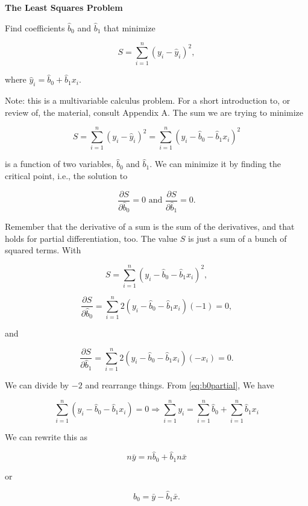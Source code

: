 \documentclass[
]{book}
\theoremstyle{definition}
\theoremstyle{definition}
\theoremstyle{definition}
\theoremstyle{definition}
\theoremstyle{remark}
\begin{document}
\begin{propbox}
\textbf{The Least Squares Problem}

Find coefficients \(\hat{b}_0\) and \(\hat{b}_1\) that minimize

\[S=\sum_{i=1}^n (y_i-\hat{y}_i)^2,\]

where \(\hat{y}_i=\hat{b}_0+\hat{b}_1 x_i.\)

\end{propbox}

Note: this is a multivariable calculus problem. For a short introduction to, or review of, the material, consult Appendix A. The sum we are trying to minimize

\[S=\sum_{i=1}^n (y_i-\hat{y}_i)^2=\sum_{i=1}^n(y_i-\hat{b}_0-\hat{b}_1x_i)^2\]

is a function of two variables, \(\hat{b}_0\) and \(\hat{b}_1\). We can minimize it by finding the critical point, i.e., the solution to

\[\frac{\partial S}{\partial \hat{b}_0}=0\text{ and }\frac{\partial S}{\partial \hat{b}_1}=0.\]

Remember that the derivative of a sum is the sum of the derivatives, and that holds for partial differentiation, too. The value \(S\) is just a sum of a bunch of squared terms. With

\[S=\sum_{i=1}^n(y_i-\hat{b}_0-\hat{b}_1x_i)^2,\]

\begin{equation}
\frac{\partial S}{\partial \hat{b}_0}=\sum_{i=1}^n 2(y_i-\hat{b}_0-\hat{b}_1x_i)(-1)=0,
\label{eq:b0partial}
\end{equation}

and

\begin{equation}
\frac{\partial S}{\partial \hat{b}_1}=\sum_{i=1}^n 2(y_i-\hat{b}_0-\hat{b}_1x_i)(-x_i)=0.
\label{eq:b1partial}
\end{equation}

We can divide by \(-2\) and rearrange things. From \eqref{eq:b0partial}, We have

\[\sum_{i=1}^n (y_i-\hat{b}_0-\hat{b}_1x_i)=0\Rightarrow \sum_{i=1}^ny_i=\sum_{i=1}^n \hat{b}_0+\sum_{i=1}^n\hat{b}_1x_i\]

We can rewrite this as

\[n\bar{y}=n\hat{b}_0+\hat{b}_1n\bar{x}\]

or

\begin{equation}
\boxed{\hat{b}_0=\bar{y}-\hat{b}_1\bar{x}.}
\label{eq:intercept}
\end{equation}
\end{document}
